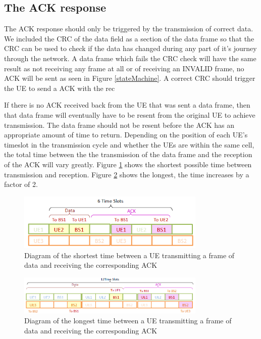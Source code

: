\subsection {The ACK response }
The ACK response should only be triggered by the transmission of correct data. We included the CRC of the data field as a section of the data frame so that the CRC can be used to check if the data has changed during any part of it's journey through the network. A data frame which fails the CRC check will have the same result as not receiving any frame at all or of receiving an INVALID frame, no ACK will be sent as seen in Figure \ref{stateMachine}. A correct CRC should trigger the UE to send a ACK with the rec

If there is no ACK received back from the UE that was sent a data frame, then that data frame will eventually have to be resent from the original UE to achieve transmission. The data frame should not be resent before the ACK has an appropriate amount of time to return. Depending on the position of each UE's timeslot in the transmission cycle and whether the UEs are within the same cell, the total time between the the transmission of the data frame and the reception of the ACK will vary greatly. Figure \ref{fig:ACKtimeshort} shows the shortest possible time between transmission and reception. Figure \ref{fig:ACKtimelong} shows the longest, the time increases by a factor of 2. 
\begin{figure}[ht]
    \centering
    \includegraphics[width=0.8\textwidth]{ACK_timeout_short.PNG}
    \caption{Diagram of the shortest time between a UE transmitting a frame of data and receiving the corresponding ACK}
    \label{fig:ACKtimeshort}
\end{figure}

\begin{figure}[ht]
    \centering
    \includegraphics[width=0.8\textwidth]{ACK_timeout_long.PNG}
    \caption{Diagram of the longest time between a UE transmitting a frame of data and receiving the corresponding ACK}
    \label{fig:ACKtimelong}
\end{figure}



